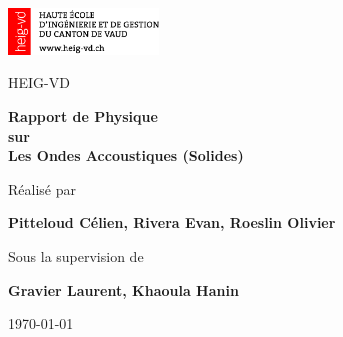 \newcommand{\supervisor}{Gravier Laurent, Khaoula Hanin}

\begin{titlepage}
    \begin{center}
        \includegraphics[width=0.3\textwidth]{HEIG_1.png} %
        \vspace{8cm}
        
        {\Large HEIG-VD}
        
        \vspace{1cm}
        \textbf{\Huge Rapport de Physique}
        \textbf{\Huge \\sur}
        \vspace{0.5cm}
        \textbf{\Huge \\Les Ondes Accoustiques (Solides)}

        \vspace{1.5cm}
        \large{Réalisé par}
        
        \vspace{0.3cm}
        {\Large \textbf{Pitteloud Célien, Rivera Evan, Roeslin Olivier}}
        
        \vspace{0.5 cm}
        \large{Sous la supervision de}
        
        \vspace{0.3cm}
        {\Large \textbf{\supervisor}}
        
        \vfill
        
        \vfill
        \large{\today}
        
    \end{center}
\end{titlepage}
